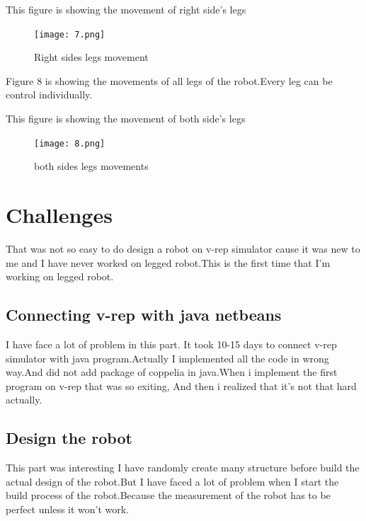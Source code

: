 \documentclass [a4paper ] {report}
\begin{document}
\begin{center}

This figure is showing the movement of right side's legs 
\vadjust{\vskip 10mm \vskip 0pt}
\begin{figure}[h]
\begin{center}
\texttt{[image: 7.png]}
\end{center}
  \caption{Right sides legs movement \vadjust{\vskip 10mm \vskip 0pt}}
\label{fig:fig2}
\end{figure}
\end{center}
\hfill \break

\newpage

Figure 8 is showing the movements of all legs of the robot.Every leg can be control individually. 

\begin{center}



This figure is showing the movement of both side's legs 
\vadjust{\vskip 10mm \vskip 0pt}
\begin{figure}[h]
\begin{center}
\texttt{[image: 8.png]}
\end{center}
  \caption{both sides legs movements \vadjust{\vskip 10mm \vskip 0pt}}
\label{fig:fig2}
\end{figure}
\end{center}
\hfill \break

\newpage


\section{Challenges}
That was not so easy to do design a robot on v-rep simulator cause it was new to me and I have never worked on legged robot.This is the first time that I'm working on legged robot.
\subsection{Connecting v-rep  with java netbeans}

I have face a lot of problem in this part. It took 10-15 days to connect v-rep simulator with java program.Actually I implemented all the code in wrong way.And did not add package of coppelia in java.When i implement the first program on v-rep that was so exiting, And then i realized that it's not that hard actually. 
\subsection{Design the robot}
This part was interesting I have randomly create many structure before build the actual design of the robot.But I have faced a lot of problem when I  start the build process of the robot.Because the measurement of the robot has to be perfect unless it won't work.
\end{document}
